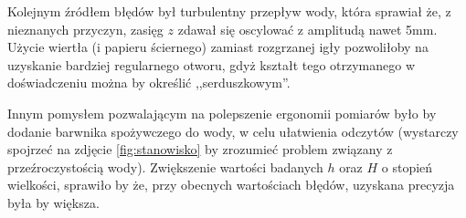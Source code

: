 \documentclass[a4paper,12pt]{article}
\begin{document}
Kolejnym źródłem błędów był turbulentny przepływ wody, która sprawiał że, z nieznanych przyczyn, zasięg $z$ zdawał się oscylować z amplitudą nawet 5mm. Użycie wiertła (i papieru ściernego) zamiast rozgrzanej igły pozwoliłoby na uzyskanie bardziej regularnego otworu, gdyż kształt tego otrzymanego w doświadczeniu można by określić ,,serduszkowym''.

Innym pomysłem pozwalającym na polepszenie ergonomii pomiarów było by dodanie barwnika spożywczego do wody, w celu ułatwienia odczytów (wystarczy spojrzeć na zdjęcie \ref{fig:stanowisko} by zrozumieć problem związany z przeźroczystością wody). Zwiększenie wartości badanych $h$ oraz $H$ o stopień wielkości, sprawiło by że, przy obecnych wartościach błędów, uzyskana precyzja była by większa.
\end{document}
